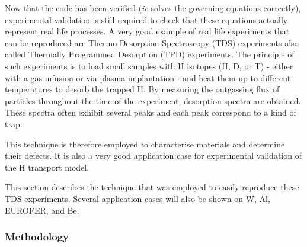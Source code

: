 Now that the code has been verified (\textit{ie} solves the governing equations correctly), experimental validation is still required to check that these equations actually represent real life processes.
A very good example of real life experiments that can be reproduced are Thermo-Desorption Spectroscopy (TDS) experiments also called Thermally Programmed Desorption (TPD) experiments.
The principle of such experiments is to load small samples with H isotopes (H, D, or T) - either with a gas infusion or via plasma implantation - and heat them up to different temperatures to desorb the trapped H.
By measuring the outgassing flux of particles throughout the time of the experiment, desorption spectra are obtained.
These spectra often exhibit several peaks and each peak correspond to a kind of trap.

This technique is therefore employed to characterise materials and determine their defects. 
It is also a very good application case for experimental validation of the H transport model.

This section describes the technique that was employed to easily reproduce these TDS experiments.
Several application cases will also be shown on W, Al, EUROFER, and Be.

\subsubsection{Methodology} \label{methodology}


